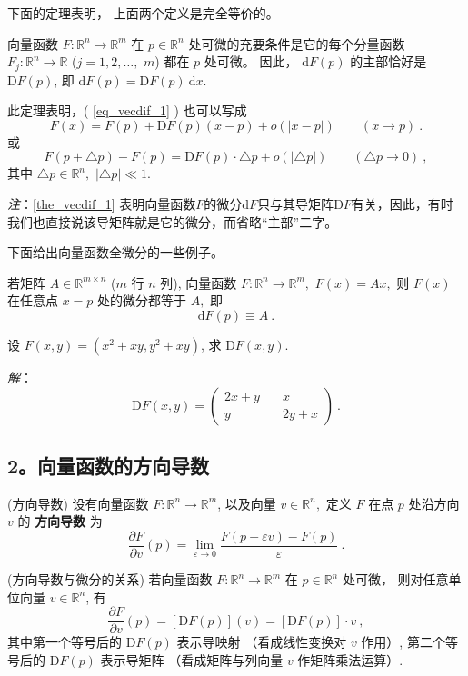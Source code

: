 下面的定理表明， 上面两个定义是完全等价的。 

\begin{theorem}{}\label{the_vecdif_1}
向量函数 $F:\mathbb{R}^{n}\rightarrow\mathbb{R}^{m}$ 在 $p\in\mathbb{R}^{n}$
处可微的充要条件是它的每个分量函数 $F_{j}:\mathbb{R}^{n}\rightarrow\mathbb{R}$ ($j=1,2,\ldots,$ $m$)
都在 $p$ 处可微。 因此， $\mathrm{d}F(p)$ 的主部恰好是 $\mathrm{D}F(p)$, 即 $\mathrm{d}F(p)=\mathrm{D}F(p)~\mathrm{d}x$.

此定理表明，( \autoref{eq_vecdif_1} ) 也可以写成
\[
  F(x)=F(p)+\mathrm{D}F(p)(x-p)+o(| x-p| )\quad\quad(x\rightarrow p)~.
\]
或
\[
F(p+\triangle p)-F(p)=\mathrm{D}F(p)\cdot\triangle p+o(|\triangle p|)\quad\quad(\triangle p\rightarrow0)~,
\]
其中 $\triangle p\in\mathbb{R}^{n},$ $|\triangle p|\ll1.$
\end{theorem}
\textsl{注}：\autoref{the_vecdif_1} 表明向量函数$F$的微分$\mathrm{d}F$只与其导矩阵$\mathrm{D}F$有关，因此，有时我们也直接说该导矩阵就是它的微分，而省略“主部”二字。


下面给出向量函数全微分的一些例子。
\begin{example}{}
若矩阵 $A\in\mathbb{R}^{m\times n}$ ($m$ 行 $n$ 列), 向量函数 $F:\mathbb{R}^{n}\rightarrow\mathbb{R}^{m},$
$F(x)=Ax,$ 则 $F(x)$ 在任意点 $x=p$ 处的微分都等于 $A,$ 即
\[
\mathrm{d}F(p)\equiv A~.
\]
\end{example}

\begin{example}{}
设 $F(x,y)=(x^{2}+xy,y^{2}+xy)$, 求 $\mathrm{D}F(x,y).$

\textsl{解}：
$$
\mathrm{D}F(x,y)=\left(\begin{array}{cc}
2x+y\quad & x\\
y & 2y+x
\end{array}\right)~.
$$
\end{example}


\subsection{2。向量函数的方向导数}
\begin{definition}{(方向导数)}
设有向量函数 $F:\mathbb{R}^{n}\rightarrow\mathbb{R}^{m}$, 以及向量 $v\in\mathbb{R}^{n},$
定义 $F$ 在点 $p$ 处沿方向 $v$ 的 \textbf{方向导数} 为 
\[
{\displaystyle \frac{\partial F}{\partial v}(p)={\displaystyle \lim_{\varepsilon\rightarrow0}{\displaystyle \frac{F(p+\varepsilon v)-F(p)}{\varepsilon}}~.}}
\]
\end{definition}

\begin{theorem}{(方向导数与微分的关系)}
若向量函数 $F:\mathbb{R}^{n}\rightarrow\mathbb{R}^{m}$ 在 $p\in\mathbb{R}^{n}$
处可微， 则对任意单位向量 $v\in\mathbb{R}^{n}$, 有
\[
\frac{\partial F}{\partial v}(p)=[\mathrm{D}F(p)](v)=[\mathrm{D}F(p)]\cdot v~,
\]
其中第一个等号后的 $\mathrm{D}F(p)$ 表示导映射 （看成线性变换对 $v$ 作用）, 第二个等号后的 $\mathrm{D}F(p)$
表示导矩阵 （看成矩阵与列向量 $v$ 作矩阵乘法运算）.
\end{theorem}


